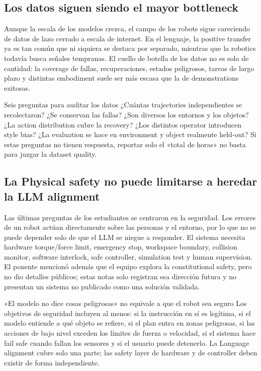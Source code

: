 \subsection{Los datos siguen siendo el mayor bottleneck}

Aunque la escala de los modelos crezca, el campo de los robots sigue careciendo de datos de lazo cerrado a escala de internet. En el lenguaje, la positive transfer ya es tan común que ni siquiera se destaca por separado, mientras que la robotics todavía busca señales tempranas. El cuello de botella de los datos no es solo de cantidad: la coverage de fallas, recuperaciones, estados peligrosos, tareas de largo plazo y distintas embodiment suele ser más escasa que la de demonstrations exitosas.

\begin{knowledgebox}{Seis preguntas para auditar los datos}
¿Cuántas trajectories independientes se recolectaron? ¿Se conservan las fallas? ¿Son diversos los entornos y los objetos? ¿La action distribution cubre la recovery? ¿Los distintos operator introducen style bias? ¿La evaluation se hace en environment y object realmente held-out? Si estas preguntas no tienen respuesta, reportar solo el «total de horas» no basta para juzgar la dataset quality.
\end{knowledgebox}

\subsection{La Physical safety no puede limitarse a heredar la LLM alignment}

Las últimas preguntas de los estudiantes se centraron en la seguridad. Los errores de un robot actúan directamente sobre las personas y el entorno, por lo que no se puede depender solo de que el LLM se niegue a responder. El sistema necesita hardware torque/force limit, emergency stop, workspace boundary, collision monitor, software interlock, safe controller, simulation test y human supervision. El ponente mencionó además que el equipo explora la constitutional safety, pero no dio detalles públicos; estas notas solo registran esa dirección futura y no presentan un sistema no publicado como una solución validada.

\begin{warningbox}{«El modelo no dice cosas peligrosas» no equivale a que el robot sea seguro}
Los objetivos de seguridad incluyen al menos: si la instrucción en sí es legítima, si el modelo entiende a qué objeto se refiere, si el plan entra en zonas peligrosas, si las acciones de bajo nivel exceden los límites de fuerza o velocidad, si el sistema hace fail safe cuando fallan los sensores y si el usuario puede detenerlo. La Language alignment cubre solo una parte; las safety layer de hardware y de controller deben existir de forma independiente.
\end{warningbox}

